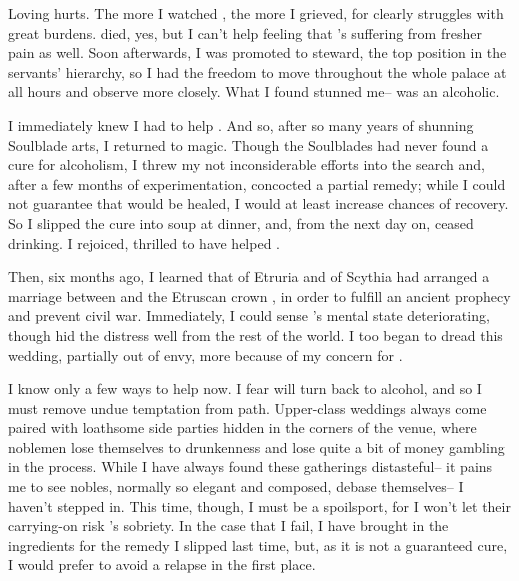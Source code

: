 \documentclass[char]{Kos}
\begin{document}
Loving \cBride{\them} hurts. The more I watched \cBride{\them}, the more I grieved, for \cBride{\they} clearly struggles with great burdens. \cBride{\Their} \cFugitive{\sibling} died, yes, but I can't help feeling that \cBride{}'s suffering from fresher pain as well. Soon afterwards, I was promoted to steward, the top position in the servants' hierarchy, so I had the freedom to move throughout the whole palace at all hours and observe \cBride{\them} more closely. What I found stunned me-- \cBride{\they} was an alcoholic.

I immediately knew I had to help \cBride{\them}. And so, after so many years of shunning Soulblade arts, I returned to magic. Though the Soulblades had never found a cure for alcoholism, I threw my not inconsiderable efforts into the search and, after a few months of experimentation, concocted a partial remedy; while I could not guarantee that \cBride{\they} would be healed, I would at least increase \cBride{\their} chances of recovery. So I slipped the cure into \cBride{\their} soup at dinner, and, from the next day on, \cBride{\they} ceased drinking. I rejoiced, thrilled to have helped \cBride{\them}.

Then, six months ago, I learned that \cEtruriaKing{\Monarch} \cEtruriaKing{} of Etruria and \cScythiaKing{\Monarch} \cScythiaKing{} of Scythia had arranged a marriage between \cBride{} and the Etruscan crown \cGroom{\prince} \cGroom{}, in order to fulfill an ancient prophecy and prevent civil war. Immediately, I could sense \cBride{}'s mental state deteriorating, though \cBride{\they} hid the distress well from the rest of the world. I too began to dread this wedding, partially out of envy, more because of my concern for \cBride{\them}.

I know only a few ways to help \cBride{\them} now. I fear \cBride{\they} will turn back to alcohol, and so I must remove undue temptation from \cBride{\their} path. Upper-class weddings always come paired with loathsome side parties hidden in the corners of the venue, where noblemen lose themselves to drunkenness and lose quite a bit of money gambling in the process. While I have always found these gatherings distasteful-- it pains me to see nobles, normally so elegant and composed, debase themselves-- I haven't stepped in. This time, though, I must be a spoilsport, for I won't let their carrying-on risk \cBride{}'s sobriety. In the case that I fail, I have brought in the ingredients for the remedy I slipped \cBride{\them} last time, but, as it is not a guaranteed cure, I would prefer to avoid a relapse in the first place.
\end{document}

